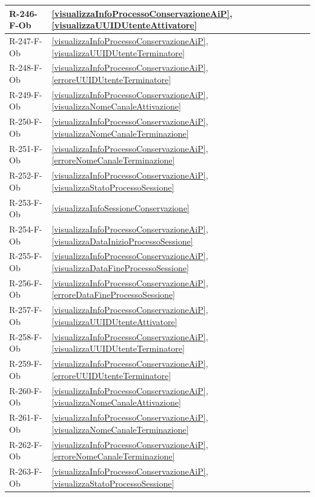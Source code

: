 \begin{longtable}{|p{4cm}|p{10cm}|}
\hline
R-246-F-Ob & \ref{visualizzaInfoProcessoConservazioneAiP}, \ref{visualizzaUUIDUtenteAttivatore} \\
\hline
R-247-F-Ob & \ref{visualizzaInfoProcessoConservazioneAiP}, \ref{visualizzaUUIDUtenteTerminatore} \\
\hline
R-248-F-Ob & \ref{visualizzaInfoProcessoConservazioneAiP}, \ref{erroreUUIDUtenteTerminatore} \\
\hline
R-249-F-Ob & \ref{visualizzaInfoProcessoConservazioneAiP}, \ref{visualizzaNomeCanaleAttivazione} \\
\hline
R-250-F-Ob & \ref{visualizzaInfoProcessoConservazioneAiP}, \ref{visualizzaNomeCanaleTerminazione} \\
\hline
R-251-F-Ob & \ref{visualizzaInfoProcessoConservazioneAiP}, \ref{erroreNomeCanaleTerminazione} \\
\hline
R-252-F-Ob & \ref{visualizzaInfoProcessoConservazioneAiP}, \ref{visualizzaStatoProcessoSessione} \\
\hline
R-253-F-Ob & \ref{visualizzaInfoSessioneConservazione} \\
\hline
R-254-F-Ob & \ref{visualizzaInfoProcessoConservazioneAiP}, \ref{visualizzaDataInizioProcessoSessione} \\
\hline
R-255-F-Ob & \ref{visualizzaInfoProcessoConservazioneAiP}, \ref{visualizzaDataFineProcessoSessione} \\
\hline
R-256-F-Ob & \ref{visualizzaInfoProcessoConservazioneAiP}, \ref{erroreDataFineProcessoSessione} \\
\hline
R-257-F-Ob & \ref{visualizzaInfoProcessoConservazioneAiP}, \ref{visualizzaUUIDUtenteAttivatore} \\
\hline
R-258-F-Ob & \ref{visualizzaInfoProcessoConservazioneAiP}, \ref{visualizzaUUIDUtenteTerminatore} \\
\hline
R-259-F-Ob & \ref{visualizzaInfoProcessoConservazioneAiP}, \ref{erroreUUIDUtenteTerminatore} \\
\hline
R-260-F-Ob & \ref{visualizzaInfoProcessoConservazioneAiP}, \ref{visualizzaNomeCanaleAttivazione} \\
\hline
R-261-F-Ob & \ref{visualizzaInfoProcessoConservazioneAiP}, \ref{visualizzaNomeCanaleTerminazione} \\
\hline
R-262-F-Ob & \ref{visualizzaInfoProcessoConservazioneAiP}, \ref{erroreNomeCanaleTerminazione} \\
\hline
R-263-F-Ob & \ref{visualizzaInfoProcessoConservazioneAiP}, \ref{visualizzaStatoProcessoSessione} \\
\hline

\end{longtable}
